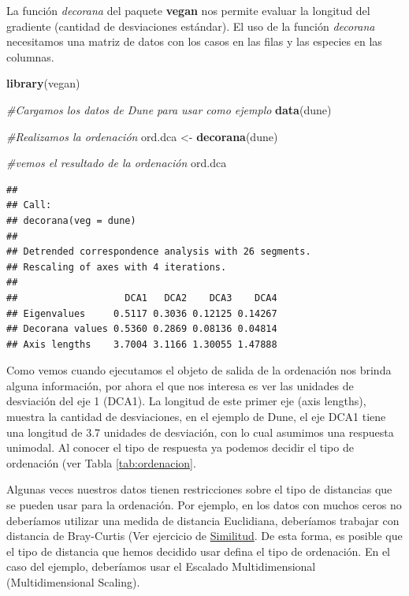 \documentclass[]{book}
\newenvironment{Shaded}{\begin{snugshade}}{\end{snugshade}}
\newcommand{\KeywordTok}[1]{\textcolor[rgb]{0.13,0.29,0.53}{\textbf{{#1}}}}
\newcommand{\StringTok}[1]{\textcolor[rgb]{0.31,0.60,0.02}{{#1}}}
\newcommand{\CommentTok}[1]{\textcolor[rgb]{0.56,0.35,0.01}{\textit{{#1}}}}
\newcommand{\NormalTok}[1]{{#1}}
\begin{document}
La función \emph{decorana} del paquete \textbf{vegan} nos permite
evaluar la longitud del gradiente (cantidad de desviaciones estándar).
El uso de la función \emph{decorana} necesitamos una matriz de datos con
los casos en las filas y las especies en las columnas.

\begin{Shaded}
\begin{Highlighting}[]
\KeywordTok{library}\NormalTok{(vegan)}

\CommentTok{#Cargamos los datos de Dune para usar como ejemplo}
\KeywordTok{data}\NormalTok{(dune)}

\CommentTok{#Realizamos la ordenación}
\NormalTok{ord.dca <-}\StringTok{ }\KeywordTok{decorana}\NormalTok{(dune)}

\CommentTok{#vemos el resultado de la ordenación}
\NormalTok{ord.dca}
\end{Highlighting}
\end{Shaded}

\begin{verbatim}
## 
## Call:
## decorana(veg = dune) 
## 
## Detrended correspondence analysis with 26 segments.
## Rescaling of axes with 4 iterations.
## 
##                   DCA1   DCA2    DCA3    DCA4
## Eigenvalues     0.5117 0.3036 0.12125 0.14267
## Decorana values 0.5360 0.2869 0.08136 0.04814
## Axis lengths    3.7004 3.1166 1.30055 1.47888
\end{verbatim}

Como vemos cuando ejecutamos el objeto de salida de la ordenación nos
brinda alguna información, por ahora el que nos interesa es ver las
unidades de desviación del eje 1 (DCA1). La longitud de este primer eje
(axis lengths), muestra la cantidad de desviaciones, en el ejemplo de
Dune, el eje DCA1 tiene una longitud de 3.7 unidades de desviación, con
lo cual asumimos una respuesta unimodal. Al conocer el tipo de respuesta
ya podemos decidir el tipo de ordenación (ver Tabla
\ref{tab:ordenacion}.

Algunas veces nuestros datos tienen restricciones sobre el tipo de
distancias que se pueden usar para la ordenación. Por ejemplo, en los
datos con muchos ceros no deberíamos utilizar una medida de distancia
Euclidiana, deberíamos trabajar con distancia de Bray-Curtis (Ver
ejercicio de
\href{https://ciespinosa.github.io/Similitud/index.html}{Similitud}. De
esta forma, es posible que el tipo de distancia que hemos decidido usar
defina el tipo de ordenación. En el caso del ejemplo, deberíamos usar el
Escalado Multidimensional (Multidimensional Scaling).
\end{document}
